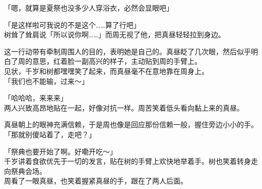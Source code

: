 「嗯，就算是夏祭也没多少人穿浴衣，必然会显眼吧」

「是这样啦可我说的不是这个……算了行吧」\\

树耸了耸肩说「所以说你啊……」而周无视了他，把真昼轻轻拉到身边。

这一行动带有牵制周围人的目的，表明她是自己的。真昼眨了几次眼，然后似乎明白了周的意思，红着脸一副高兴的样子，主动贴到周的手臂上。\\

见状，千岁和树都嘿嘿笑了起来，而真昼毫不在意地靠在周身上。\\

「我们也不能输，过来～」

「哈哈哈，来来来」\\

两人兴致高昂地贴在一起，好像对抗一样。周苦笑着低头看向黏上来的真昼。

真昼朝上的眼神充满信赖，于是周也像是回应那份信赖一般，握住旁边小小的手。\\

「那就别傻站着了，走吧？」

「祭典也要开始了啊。好嘞开吃～」\\

千岁讲着食欲优先于一切的发言，贴在树的手臂上欢快地举着手。树也笑着转身走向祭典会场。\\

周看了一眼真昼，也笑着握紧真昼的手，跟在了两人后面。

